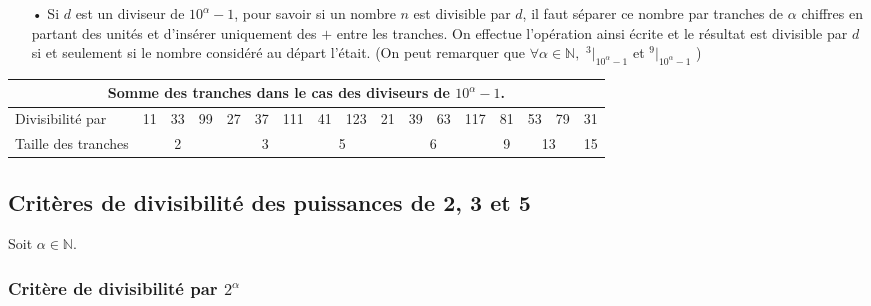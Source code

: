 \documentclass[a4paper, twoside]{article}
\begin{document}
	\begin{itemize}

		\item[•] Si $d$ est un diviseur de $10^\alpha - 1$, pour savoir si un nombre $n$ est divisible par $d$, il faut séparer ce nombre par tranches de $\alpha$ chiffres en partant des unités et d'insérer uniquement des $+$ entre les tranches. On effectue l'opération ainsi écrite et le résultat est divisible par $d$ si et seulement si le nombre considéré au départ l'était. (On peut remarquer que $\forall \alpha \in \mathbb{N},$ {\large $^{3}|_{10^\alpha - 1}$} et {\large $^{9}|_{10^\alpha - 1}$} \big)
		
		\vspace{0.2cm}

	\end{itemize}
		
		{ \noindent
		\begin{tabular}{|l|c|c|c|c|c|c|c|c|c|c|c|c|c|c|c|c|}
		
			\multicolumn{17}{c}{{\small \textbf{Somme des tranches dans le cas des diviseurs de {\boldmath $10^\alpha - 1$}.}}} \\
			\hline 
			
			{\normalsize Divisibilité par} & \footnotesize 11 & \footnotesize 33 & \footnotesize 99 & \footnotesize 27 & \footnotesize 37 & \footnotesize 111 & \footnotesize 41 & \footnotesize 123 & \footnotesize 21 & \footnotesize 39 & \footnotesize 63 & \footnotesize 117 & \footnotesize 81 & \footnotesize 53 & \footnotesize 79 & \footnotesize 31 \\ 
			\hline 
			Taille des tranches & \multicolumn{3}{c|}{2} & \multicolumn{3}{c|}{3} & \multicolumn{2}{c|}{5} & \multicolumn{4}{c|}{6} & 9 & \multicolumn{2}{c|}{13} & 15 \\ 
	\hline 
	\end{tabular} }

	\newpage






	\subsection{Critères de divisibilité des puissances de 2, 3 et 5}

	Soit $\alpha \in \mathbb{N}$.

	\subsubsection*{Critère de divisibilité par $2^\alpha$}
\end{document}
